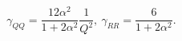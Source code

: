 \begin{equation}
\gamma_{QQ}= \frac{12\alpha^2}{1+2\alpha^2}\frac{1}{Q^2},\
\gamma_{RR}=\frac{6}{1+2\alpha^2}.
\end{equation}

